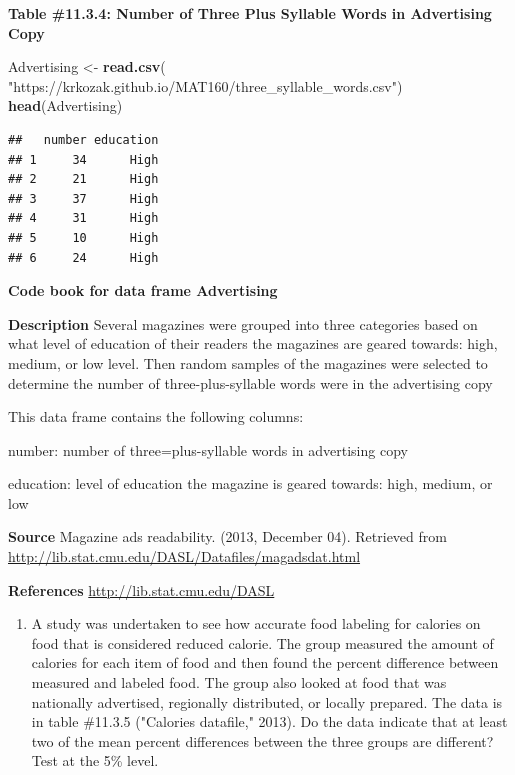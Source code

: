 \documentclass[
]{book}
\newenvironment{Shaded}{\begin{snugshade}}{\end{snugshade}}
\newcommand{\KeywordTok}[1]{\textcolor[rgb]{0.13,0.29,0.53}{\textbf{#1}}}
\newcommand{\NormalTok}[1]{#1}
\newcommand{\StringTok}[1]{\textcolor[rgb]{0.31,0.60,0.02}{#1}}
\providecommand{\tightlist}{%
  \setlength{\itemsep}{0pt}\setlength{\parskip}{0pt}}
\begin{document}
\textbf{Table \#11.3.4: Number of Three Plus Syllable Words in Advertising Copy}

\begin{Shaded}
\begin{Highlighting}[]
\NormalTok{Advertising <-}\StringTok{ }\KeywordTok{read.csv}\NormalTok{(}
  \StringTok{"https://krkozak.github.io/MAT160/three_syllable_words.csv"}\NormalTok{)}
\KeywordTok{head}\NormalTok{(Advertising)}
\end{Highlighting}
\end{Shaded}

\begin{verbatim}
##   number education
## 1     34      High
## 2     21      High
## 3     37      High
## 4     31      High
## 5     10      High
## 6     24      High
\end{verbatim}

\textbf{Code book for data frame Advertising}

\textbf{Description}
Several magazines were grouped into three categories based on what level of education of their readers the magazines are geared towards: high, medium, or low level. Then random samples of the magazines were selected to determine the number of three-plus-syllable words were in the advertising copy

This data frame contains the following columns:

number: number of three=plus-syllable words in advertising copy

education: level of education the magazine is geared towards: high, medium, or low

\textbf{Source}
Magazine ads readability. (2013, December 04). Retrieved from \url{http://lib.stat.cmu.edu/DASL/Datafiles/magadsdat.html}

\textbf{References}
\url{http://lib.stat.cmu.edu/DASL}

\begin{enumerate}
\def\labelenumi{\arabic{enumi}.}
\setcounter{enumi}{3}
\tightlist
\item
  A study was undertaken to see how accurate food labeling for calories on food that is considered reduced calorie. The group measured the amount of calories for each item of food and then found the percent difference between measured and labeled food. The group also looked at food that was nationally advertised, regionally distributed, or locally prepared. The data is in table \#11.3.5 ("Calories datafile," 2013). Do the data indicate that at least two of the mean percent differences between the three groups are different? Test at the 5\% level.
\end{enumerate}
\end{document}
